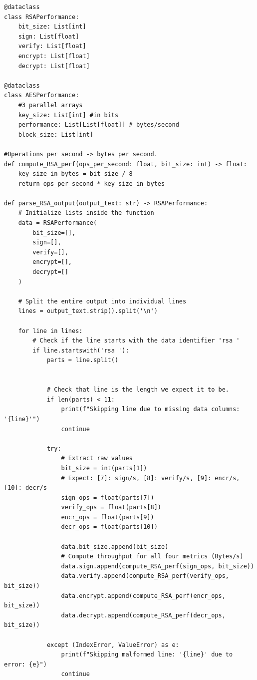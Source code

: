 \documentclass[11pt]{article}
\begin{document}
\begin{lstlisting}
@dataclass
class RSAPerformance:
    bit_size: List[int]
    sign: List[float]
    verify: List[float]
    encrypt: List[float]
    decrypt: List[float] 

@dataclass
class AESPerformance:
    #3 parallel arrays
    key_size: List[int] #in bits
    performance: List[List[float]] # bytes/second
    block_size: List[int]

#Operations per second -> bytes per second.
def compute_RSA_perf(ops_per_second: float, bit_size: int) -> float:
    key_size_in_bytes = bit_size / 8
    return ops_per_second * key_size_in_bytes

def parse_RSA_output(output_text: str) -> RSAPerformance:
    # Initialize lists inside the function
    data = RSAPerformance(
        bit_size=[],
        sign=[],
        verify=[],
        encrypt=[],
        decrypt=[]
    )

    # Split the entire output into individual lines
    lines = output_text.strip().split('\n')

    for line in lines:
        # Check if the line starts with the data identifier 'rsa '
        if line.startswith('rsa '):
            parts = line.split()

            
            # Check that line is the length we expect it to be.
            if len(parts) < 11:
                print(f"Skipping line due to missing data columns: '{line}'")
                continue
                 
            try:
                # Extract raw values
                bit_size = int(parts[1])
                # Expect: [7]: sign/s, [8]: verify/s, [9]: encr/s, [10]: decr/s
                sign_ops = float(parts[7])
                verify_ops = float(parts[8])
                encr_ops = float(parts[9])
                decr_ops = float(parts[10])

                data.bit_size.append(bit_size)
                # Compute throughput for all four metrics (Bytes/s)
                data.sign.append(compute_RSA_perf(sign_ops, bit_size))
                data.verify.append(compute_RSA_perf(verify_ops, bit_size))
                data.encrypt.append(compute_RSA_perf(encr_ops, bit_size))
                data.decrypt.append(compute_RSA_perf(decr_ops, bit_size))

            except (IndexError, ValueError) as e:
                print(f"Skipping malformed line: '{line}' due to error: {e}")
                continue


\end{lstlisting}
\end{document}
